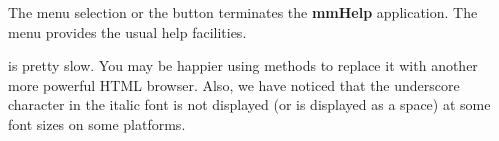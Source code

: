 The menu selection  or the  button
terminates the {\bf mmHelp} application.  
The menu  provides the usual help facilities.

 is pretty slow.  You may be happier using
 methods to replace it
with another more powerful HTML browser.  Also, we have noticed that the
underscore character in the italic font is not displayed (or is
displayed as a space) at some font sizes on some platforms.

